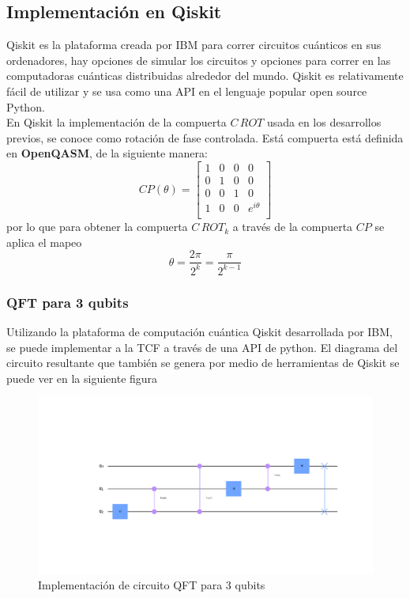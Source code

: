 \documentclass[a4paper]{article}
\begin{document}
\subsection{Implementación en Qiskit}
Qiskit es la plataforma creada por IBM para correr circuitos cuánticos en sus ordenadores, hay opciones de simular los circuitos y opciones para correr en las computadoras cuánticas distribuidas alrededor del mundo. Qiskit es relativamente fácil de utilizar y se usa como una API en el lenguaje popular open source Python.\\

En Qiskit la implementación de la compuerta $C\, ROT$ usada en los desarrollos previos, se conoce como rotación de fase controlada. Está compuerta está definida en \textbf{OpenQASM}, \cite{openQASM} de la siguiente manera:
\begin{equation}
CP(\theta)=
\begin{bmatrix}
1&0&0&0\\
0&1&0&0\\
0&0&1&0\\
1&0&0&e^{i\theta}\\
\end{bmatrix}
\end{equation}
por lo que para obtener la compuerta $C\, ROT_k$ a través de la compuerta $CP$ se aplica el mapeo
\begin{equation}
\theta=\frac{2\pi}{2^k}=\frac{\pi}{2^{k-1}}
\end{equation}
\subsubsection{QFT para 3 qubits}
Utilizando la plataforma de computación cuántica Qiskit desarrollada por IBM, se puede implementar a la TCF a través de una API de python. El diagrama del circuito resultante que también se genera por medio de herramientas de Qiskit se puede ver en la siguiente figura
\begin{figure}[h]
\includegraphics[scale=0.5, center]{./qft_3_qubits.png} 
\caption{Implementación de circuito QFT para 3 qubits}
\label{fig::QFT_circuit}
\end{figure}
\end{document}
